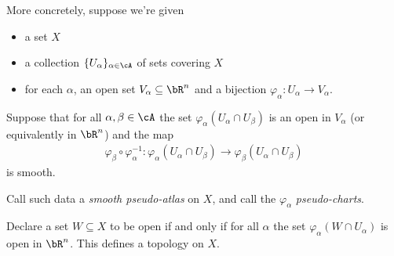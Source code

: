 More concretely, suppose we're given
\begin{itemize}
	\item a set $X$
	\item a collection $\{U_\alpha\}_{\alpha \in \cA}$ of sets covering $X$
	\item for each $\alpha$, an open set $V_\alpha \subseteq \bR^n$ and a bijection $\varphi_\alpha:U_\alpha \to V_\alpha$.
\end{itemize}
Suppose that for all $\alpha,\beta \in \cA$ the set $\varphi_\alpha(U_\alpha\cap U_\beta)$ is an open in $V_\alpha$ (or equivalently in $\bR^n$) and the map
\begin{align*}
	\varphi_\beta\circ \varphi_\alpha^{-1}: \varphi_\alpha(U_\alpha \cap U_\beta) \to \varphi_\beta(U_\alpha \cap U_\beta)
\end{align*}
is smooth.

\begin{defn}\label{defn:smooth-pseudo-atlas}
	Call such data a \emph{smooth pseudo-atlas} on $X$, and call the $\varphi_\alpha$ \emph{pseudo-charts}.
\end{defn}

\begin{lem}\label{lem:pseudo-atlas-yields-topology}    
    Declare a set $W \subseteq X$ to be open if and only if for all $\alpha$ the set $\varphi_\alpha(W \cap U_\alpha)$ is open in $\bR^n$. This defines a topology on $X$.
\end{lem}

